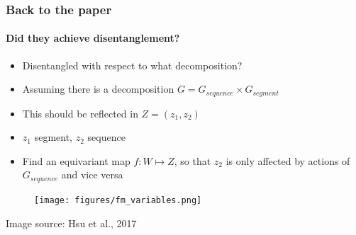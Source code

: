 \documentclass[9pt]{beamer}
\begin{document}





\begin{frame}
\frametitle{Back to the paper}
\framesubtitle{Did they achieve disentanglement?}
\begin{itemize}
	\item Disentangled with respect to what decomposition?
	\item Assuming there is a decomposition $G = G_{sequence} \times G_{segment}$
	\item This should be reflected in $Z= (z_1, z_2)$
	\item $z_1$ segment, $z_2$ sequence
	\item Find an equivariant map $f:W\mapsto Z$, so that $z_2$ is only affected by actions of $G_{sequence}$ and vice versa
\end{itemize}
\begin{figure}
	\texttt{[image: figures/fm\_variables.png]}
\end{figure}
\begin{tiny}
	Image source: Hsu et al., 2017 
\end{tiny}
\end{frame} 
\end{document}
